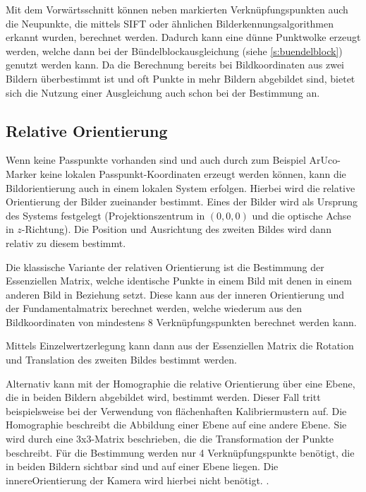 \documentclass[./00PhotoBox.tex]{subfiles}
\begin{document}
Mit dem Vorwärts\-schnitt können neben markierten Verknüpfungspunkten auch die Neupunkte, die mittels SIFT oder ähnlichen Bild\-erkennungs\-algorithmen erkannt wurden, berechnet werden. Dadurch kann eine dünne Punktwolke erzeugt werden, welche dann bei der Bündelblockausgleichung (siehe \autoref{s:buendelblock}) genutzt werden kann. Da die Berechnung bereits bei Bildkoordinaten aus zwei Bildern überbestimmt ist und oft Punkte in mehr Bildern abgebildet sind, bietet sich die Nutzung einer Ausgleichung auch schon bei der Bestimmung an. \citep[vgl.][S. 385]{luhmann}

\subsection{Relative Orientierung}
\label{ss:relative_orientierung}
Wenn keine Passpunkte vorhanden sind und auch durch zum Beispiel ArUco-Marker keine lokalen Passpunkt-Koordinaten erzeugt werden können, kann die Bildorientierung auch in einem lokalen System erfolgen. Hierbei wird die relative Orientierung der Bilder zueinander bestimmt. Eines der Bilder wird als Ursprung des Systems festgelegt (Projektionszentrum in $(0,0,0)$ und die optische Achse in $z$-Richtung). Die Position und Ausrichtung des zweiten Bildes wird dann relativ zu diesem bestimmt. \citep[vgl.][S. 316]{luhmann}

Die klassische Variante der relativen Orientierung ist die Bestimmung der Essenziellen Matrix, welche identische Punkte in einem Bild mit denen in einem anderen Bild in Beziehung setzt. Diese kann aus der inneren Orientierung und der Fundamentalmatrix berechnet werden, welche wiederum aus den Bildkoordinaten von mindestens 8 Verknüpfungspunkten berechnet werden kann. \citep[vgl.][S. 328ff]{luhmann}

Mittels Einzelwertzerlegung kann dann aus der Essenziellen Matrix die Rotation und Translation des zweiten Bildes bestimmt werden. \citep[vgl.][S. 275]{hartley}

Alternativ kann mit der Homographie die relative Orientierung über eine Ebene, die in beiden Bildern abgebildet wird, bestimmt werden. Dieser Fall tritt beispielsweise bei der Verwendung von flächenhaften Kalibriermustern auf. Die Homographie beschreibt die Abbildung einer Ebene auf eine andere Ebene. Sie wird durch eine 3x3-Matrix beschrieben, die die Transformation der Punkte beschreibt. Für die Bestimmung werden nur 4 Verknüpfungspunkte benötigt, die in beiden Bildern sichtbar sind und auf einer Ebene liegen. Die \gls{innereOrientierung} der Kamera wird hierbei nicht benötigt. \citep[vgl.][S. 33ff]{hartley}.
\end{document}
